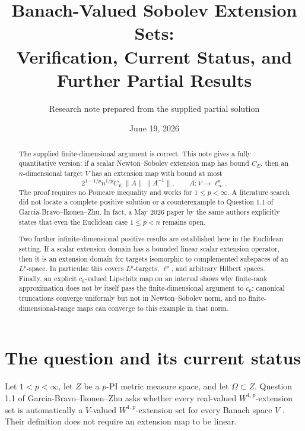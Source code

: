 \documentclass[11pt]{article}
\title{Banach-Valued Sobolev Extension Sets:\\
Verification, Current Status, and Further Partial Results}
\author{Research note prepared from the supplied partial solution}
\date{June 19, 2026}
\theoremstyle{remark}
\newcommand{\Om}{\Omega}
\newcommand{\Wp}{W^{1,p}}
\begin{document}
\maketitle

\begin{abstract}
The supplied finite-dimensional argument is correct.  This note gives a
fully quantitative version: if a scalar Newton--Sobolev extension map has
bound $C_E$, then an $n$-dimensional target $V$ has an extension map with
bound at most
\[
  2^{1-1/p} n^{1/p} C_E\,\|A\|\,\|A^{-1}\|,
  \qquad A:V\longrightarrow \ell_\infty^n.
\]
The proof requires no Poincare inequality and works for $1\le p<\infty$.
A literature search did not locate a complete positive solution or a
counterexample to Question 1.1 of Garcia-Bravo--Ikonen--Zhu.  In fact, a
May 2026 paper by the same authors explicitly states that even the Euclidean
case $1\le p<n$ remains open.

Two further infinite-dimensional positive results are established here in
the Euclidean setting.  If a scalar extension domain has a bounded linear
scalar extension operator, then it is an extension domain for targets
isomorphic to complemented subspaces of an $L^p$-space.  In particular this
covers $L^p$-targets, $\ell^p$, and arbitrary Hilbert spaces.  Finally, an
explicit $c_0$-valued Lipschitz map on an interval shows why finite-rank
approximation does not by itself pass the finite-dimensional argument to
$c_0$: canonical truncations converge uniformly but not in Newton--Sobolev
norm, and no finite-dimensional-range maps can converge to this example in
that norm.
\end{abstract}

\begin{center}
\end{center}

\section{The question and its current status}

Let $1<p<\infty$, let $Z$ be a $p$-PI metric measure space, and let
$\Om\subset Z$.  Question 1.1 of Garcia-Bravo--Ikonen--Zhu asks whether every
real-valued $\Wp$-extension set is automatically a $V$-valued
$\Wp$-extension set for every Banach space $V$ \cite{GBIZ23}.
Their definition does not require an extension map to be linear.
\end{document}
